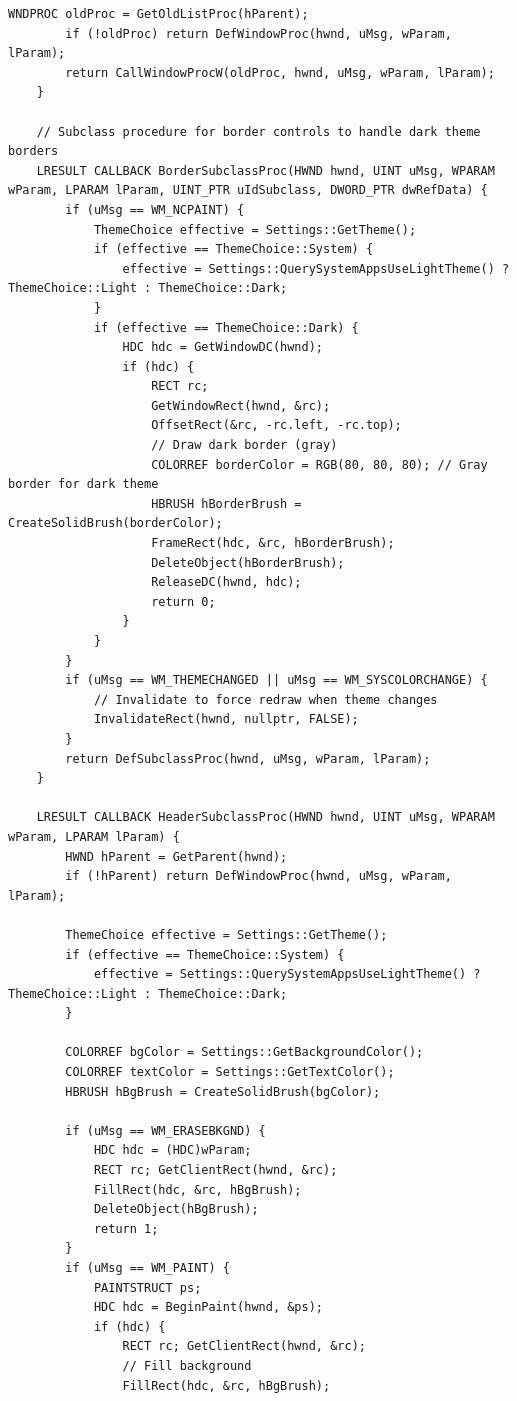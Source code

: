 \begin{lstlisting}[style=CodeListing]
        WNDPROC oldProc = GetOldListProc(hParent);
        if (!oldProc) return DefWindowProc(hwnd, uMsg, wParam, lParam);
        return CallWindowProcW(oldProc, hwnd, uMsg, wParam, lParam);
    }
    
    // Subclass procedure for border controls to handle dark theme borders
    LRESULT CALLBACK BorderSubclassProc(HWND hwnd, UINT uMsg, WPARAM wParam, LPARAM lParam, UINT_PTR uIdSubclass, DWORD_PTR dwRefData) {
        if (uMsg == WM_NCPAINT) {
            ThemeChoice effective = Settings::GetTheme();
            if (effective == ThemeChoice::System) {
                effective = Settings::QuerySystemAppsUseLightTheme() ? ThemeChoice::Light : ThemeChoice::Dark;
            }
            if (effective == ThemeChoice::Dark) {
                HDC hdc = GetWindowDC(hwnd);
                if (hdc) {
                    RECT rc;
                    GetWindowRect(hwnd, &rc);
                    OffsetRect(&rc, -rc.left, -rc.top);
                    // Draw dark border (gray)
                    COLORREF borderColor = RGB(80, 80, 80); // Gray border for dark theme
                    HBRUSH hBorderBrush = CreateSolidBrush(borderColor);
                    FrameRect(hdc, &rc, hBorderBrush);
                    DeleteObject(hBorderBrush);
                    ReleaseDC(hwnd, hdc);
                    return 0;
                }
            }
        }
        if (uMsg == WM_THEMECHANGED || uMsg == WM_SYSCOLORCHANGE) {
            // Invalidate to force redraw when theme changes
            InvalidateRect(hwnd, nullptr, FALSE);
        }
        return DefSubclassProc(hwnd, uMsg, wParam, lParam);
    }
    
    LRESULT CALLBACK HeaderSubclassProc(HWND hwnd, UINT uMsg, WPARAM wParam, LPARAM lParam) {
        HWND hParent = GetParent(hwnd);
        if (!hParent) return DefWindowProc(hwnd, uMsg, wParam, lParam);
        
        ThemeChoice effective = Settings::GetTheme();
        if (effective == ThemeChoice::System) {
            effective = Settings::QuerySystemAppsUseLightTheme() ? ThemeChoice::Light : ThemeChoice::Dark;
        }
        
        COLORREF bgColor = Settings::GetBackgroundColor();
        COLORREF textColor = Settings::GetTextColor();
        HBRUSH hBgBrush = CreateSolidBrush(bgColor);
        
        if (uMsg == WM_ERASEBKGND) {
            HDC hdc = (HDC)wParam;
            RECT rc; GetClientRect(hwnd, &rc);
            FillRect(hdc, &rc, hBgBrush);
            DeleteObject(hBgBrush);
            return 1;
        }
        if (uMsg == WM_PAINT) {
            PAINTSTRUCT ps;
            HDC hdc = BeginPaint(hwnd, &ps);
            if (hdc) {
                RECT rc; GetClientRect(hwnd, &rc);
                // Fill background
                FillRect(hdc, &rc, hBgBrush);
                

\end{lstlisting}
